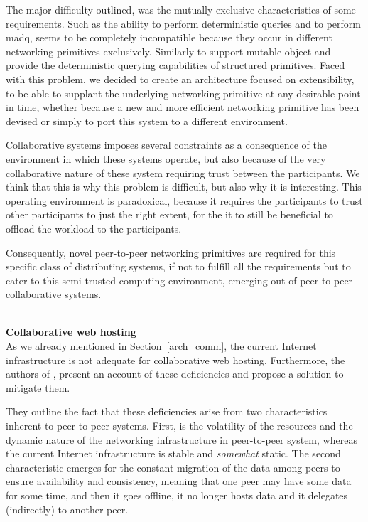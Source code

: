 \documentclass[12pt, titlepage]{uo_temp}
\begin{document}
     The major difficulty outlined, was the mutually exclusive characteristics of some
     requirements. Such as the ability to perform deterministic queries and to perform
     \gls{madq}, seems to be completely incompatible because they occur in different
     networking primitives exclusively. Similarly to support mutable object and provide
     the deterministic querying capabilities of structured primitives.  Faced with this
     problem, we decided to create an architecture focused on extensibility, to be able to
     supplant the underlying networking primitive at any desirable point in time, whether
     because a new and more efficient networking primitive has been devised or simply to
     port this system to a different environment.

     Collaborative systems imposes several constraints as a consequence of the environment
     in which these systems operate, but also because of the very collaborative nature of
     these system requiring trust between the participants. We think that this is why this
     problem is difficult, but also why it is interesting. This operating environment is
     paradoxical, because it requires the participants to trust other participants to just
     the right extent, for the it to still be beneficial to offload the workload to the
     participants.

     Consequently, novel peer-to-peer networking primitives are required for this specific
     class of distributing systems, if not to fulfill all the requirements
     \cite{p2p_collab} but to cater to this semi-trusted computing environment, emerging
     out of peer-to-peer collaborative systems.

     \\ \textbf{Collaborative web hosting} \\
     As we already mentioned in Section~\ref{arch_comm}, the current Internet
     infrastructure is not adequate for collaborative web hosting. Furthermore, the
     authors of \cite{ahmed2014collaborative}, present an account of
     these deficiencies and propose a solution to mitigate them.

     They outline the fact that these deficiencies arise from two characteristics inherent
     to peer-to-peer systems. First, is the volatility of the resources and the dynamic
     nature of the networking infrastructure in peer-to-peer system, whereas the current
     Internet infrastructure is stable and \emph{somewhat} static. The second
     characteristic emerges for the constant migration of the data among peers to ensure
     availability and consistency, meaning that one peer may have some data for some time,
     and then it goes offline, it no longer hosts data and it delegates (indirectly) to
     another peer.
\end{document}
